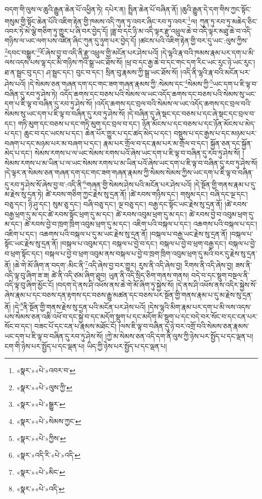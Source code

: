 བདག་གི་ལུས་ལ་ཆུའི་རྒྱུན་ཆེན་པོ་འཕྱིན་ཏེ། དཔེར་ན། སྤྲིན་ཆེན་པོ་བཞིན་ནོ། །ཆུའི་རྒྱུན་དེ་དག་གིས་ཀྱང་སྟོང་གསུམ་གྱི་སྟོང་ཆེན་པོའི་འཇིག་རྟེན་གྱི་ཁམས་འདི་ཀུན་ཏུ་འབར་ཞིང་རབ་ཏུ་འབར་\footnote{«སྣར་»«པེ་»འབར་བ་}ལ། ཀུན་ཏུ་རབ་ཏུ་མཆེད་ཅིང་འབར་ཏེ་མེ་ལྕེ་གཅིག་ཏུ་གྱུར་པ་ཞི་བར་བྱེད་དོ། །ཟླ་བ་དང་ཉི་མ་འདི་ལྟར་རྫུ་འཕྲུལ་ཆེ་བ་འདི་ལྟར་མཐུ་ཆེ་བ་འདི་གཉིས་ལ་ཡང་ལག་པས་འཛིན་ཞིང་ཀུན་དུ་ཉུག་པར་བྱེད་དོ། །ཚངས་པའི་འཇིག་རྟེན་གྱི་བར་དུ་ཡང་:ལུས་ཀྱིས་\footnote{«སྣར་»«པེ་»ལུས་ཀྱི་}དབང་བསྒྱུར་\footnote{«སྣར་»«པེ་»སྒྱུར་}རོ་ཞེས་བྱ་བ་འདི་ནི་རྫུ་འཕྲུལ་གྱི་མངོན་པར་ཤེས་པའོ། །དེ་ལྷའི་རྣ་བའི་ཁམས་རྣམ་པར་དག་པ་མི་ལས་འདས་པས་ལྷ་དང་མི་གཉིས་ཀའི་སྒྲ་ཡང་ཐོས་སོ། །ཕྲ་བ་དང་རྒྱ་ཆེ་བ་དང་གང་དག་རིང་ཡང་རུང་ཉེ་ཡང་རུང་། ཐ་ན་སྦྲང་བུ་དང་། ཤ་སྦྲང་དང་། བུང་བ་དང་། སྲིན་བུ་རྣམས་ཀྱི་སྒྲ་ཡང་ཐོས་སོ། །འདི་ནི་ལྷའི་རྣ་བའི་མངོན་པར་ཤེས་པའོ། །དེ་སེམས་ཅན་གཞན་དག་དང་གང་ཟག་གཞན་རྣམས་ཀྱི་:སེམས་དང་\footnote{«སྣར་»«པེ་»སེམས་ཀྱང་}སེམས་ཀྱི་\footnote{«སྣར་»«པེ་»ཀྱིས་}ཡང་དག་པ་ཇི་ལྟ་བ་བཞིན་དུ་རབ་ཏུ་ཤེས་ཏེ། འདོད་ཆགས་དང་བཅས་པའི་སེམས་ལ་ཡང་འདོད་ཆགས་དང་བཅས་པའི་སེམས་སུ་ཡང་དག་པ་ཇི་ལྟ་བ་བཞིན་དུ་རབ་ཏུ་ཤེས་སོ། །འདོད་ཆགས་དང་བྲལ་བའི་སེམས་ལ་ཡང་འདོད་ཆགས་དང་བྲལ་བའི་སེམས་སུ་ཡང་དག་པ་ཇི་ལྟ་བ་བཞིན་དུ་རབ་ཏུ་ཤེས་སོ། །དེ་བཞིན་དུ་ཞེ་སྡང་དང་བཅས་པ་དང་ཞེ་སྡང་དང་བྲལ་བ་དང་། གཏི་མུག་དང་བཅས་པ་དང་གཏི་མུག་དང་བྲལ་བ་དང་། ཉོན་མོངས་པ་དང་བཅས་པ་དང་ཉོན་མོངས་པ་མེད་པ་དང་། ཆུང་བ་དང་ཡངས་པ་དང་། ཆེན་པོར་གྱུར་པ་དང་ཚད་མེད་པ་དང་། བསྡུས་པ་དང་རྒྱས་པ་དང་མཉམ་པར་བཞག་པ་དང་མཉམ་པར་མ་བཞག་པ་དང་། རྣམ་པར་གྲོལ་བ་དང་རྣམ་པར་མ་གྲོལ་བ་དང་། སྐྱོན་ཅན་དང་སྐྱོན་མེད་པ་དང་། སེམས་རགས་པ་ལ་ཡང་སེམས་རགས་པའོ་ཞེས་ཡང་དག་པ་ཇི་ལྟ་བ་བཞིན་དུ་རབ་ཏུ་ཤེས་སོ། །སེམས་རགས་པ་མ་ཡིན་པ་ལ་ཡང་སེམས་རགས་པ་མ་ཡིན་པའོ་ཞེས་ཡང་དག་པ་ཇི་ལྟ་བ་བཞིན་དུ་རབ་ཏུ་ཤེས་སོ། །དེ་ལྟར་ན་སེམས་ཅན་གཞན་དག་དང་གང་ཟག་གཞན་རྣམས་ཀྱི་སེམས་སེམས་ཀྱིས་ཡང་དག་པ་ཇི་ལྟ་བ་བཞིན་དུ་རབ་ཏུ་ཤེས་སོ་ཞེས་བྱ་བ་:འདི་ནི་\footnote{«སྣར་»འདི་རི་«པེ་»འདི་}གཞན་གྱི་སེམས་ཤེས་པའི་མངོན་པར་ཤེས་པའོ། །དེ་སྔོན་གྱི་གནས་རྣམ་པ་དུ་མ་རྗེས་སུ་དྲན་ཏེ། ཚེ་རབས་གཅིག་ཀྱང་རྗེས་སུ་དྲན་ནོ། །ཚེ་རབས་གཉིས་དང་། གསུམ་དང་། བཞི་དང་ལྔ་དང་། བཅུ་དང་། ཉི་ཤུ་དང་། སུམ་ཅུ་དང་། བཞི་བཅུ་དང་། ལྔ་བཅུ་དང་། བརྒྱ་དང་སྟོང་ཡང་རྗེས་སུ་དྲན་ནོ། །ཚེ་རབས་བརྒྱ་ཕྲག་དུ་མ་དང་ཚེ་རབས་སྟོང་ཕྲག་དུ་མ་དང་། ཚེ་རབས་འབུམ་ཕྲག་དུ་མ་དང་། ཚེ་རབས་བྱེ་བ་འབུམ་ཕྲག་དུ་མ་དང་། ཚེ་རབས་བྱེ་བ་ཁྲག་ཁྲིག་འབུམ་ཕྲག་དུ་མ་དང་། འཇིག་པའི་བསྐལ་པ་དང་། འཆགས་པའི་བསྐལ་པ་དང་། འཇིག་པ་དང་། འཆགས་པའི་བསྐལ་པ་དུ་མ་ཡང་རྗེས་སུ་དྲན་ནོ། །བསྐལ་པ་བརྒྱ་ཡང་རྗེས་སུ་དྲན་ནོ། །བསྐལ་པ་སྟོང་ཡང་རྗེས་སུ་དྲན་ནོ། །བསྐལ་པ་འབུམ་དང་། བསྐལ་པ་བྱེ་བ་དང་། བསྐལ་པ་བྱེ་བ་ཕྲག་བརྒྱ་དང་། བསྐལ་པ་བྱེ་བ་ཕྲག་སྟོང་དང་། བསྐལ་པ་བྱེ་བ་ཕྲག་འབུམ་ནས་བསྐལ་པ་བྱེ་བ་ཁྲག་ཁྲིག་འབུམ་ཕྲག་དུ་མའི་བར་དུ་རྗེས་སུ་དྲན་ནོ། །ཆེ་གེ་མོ་ཞིག་ན་བདག་:མིང་ནི་\footnote{«སྣར་»«པེ་»མིང་}འདི་ཞེས་བྱ་བར་གྱུར། རུས་ནི་འདི་ཞེས་བྱ། རིགས་ནི་འདི་ཞེས་བྱ། ཟས་ནི་འདི་ལྟ་བུ་ཞིག་ཟ་ཟ། ཚེ་ནི་འདི་ཙམ་ཞིག་ཐུབ། ཡུན་ནི་འདི་སྲིད་ཅིག་གནས་གནས། བདེ་བ་དང་སྡུག་བསྔལ་ནི་འདི་ལྟ་བུ་ཞིག་མྱོང་ངོ། །བདག་དེ་ནས་ཤི་འཕོས་ནས་ཆེ་གེ་མོ་ཞིག་ཏུ་སྐྱེས་སོ། །དེ་ནས་ཤི་འཕོས་ནས་འདིར་སྐྱེས་སོ་ཞེས་རྣམ་པ་དང་བཅས་དན་རྟགས་དང་བཅས་རྒྱུ་མཚན་དང་བཅས་པར་སྔོན་གྱི་གནས་རྣམ་པ་དུ་མ་རྗེས་སུ་དྲན་ནོ། །དེ་\footnote{«སྣར་»«པེ་»འདི་}ནི་སྔོན་གྱི་གནས་རྗེས་སུ་དྲན་པའི་མངོན་པར་ཤེས་པའོ། །དེས་ལྷའི་མིག་རྣམ་པར་དག་པ་མི་ལས་འདས་པས་སེམས་ཅན་འཆི་འཕོ་བ་དང་སྐྱེ་བ་དང་མདོག་སྡུག་པ་དང་མདོག་མི་སྡུག་པ་དང་བདེ་བར་སོང་བ་དང་ངན་པར་སོང་བ་དང་། བཟང་པོ་དང་ངན་པ་རྣམས་མཐོང་ངོ། །ལས་ཇི་ལྟ་བ་བཞིན་དུ་ཉེ་བར་འགྲོ་བའི་སེམས་ཅན་རྣམས་ཡང་དག་པ་ཇི་ལྟ་བ་བཞིན་དུ་རབ་ཏུ་ཤེས་སོ། །ཀྱེ་མ་སེམས་ཅན་འདི་དག་ནི་ལུས་ཀྱི་ཉེས་པར་སྤྱོད་པ་དང་ལྡན་པ། ངག་གི་ཉེས་པར་སྤྱོད་པ་དང་ལྡན་པ། ཡིད་ཀྱི་ཉེས་པར་སྤྱོད་པ་དང་ལྡན་པ། 